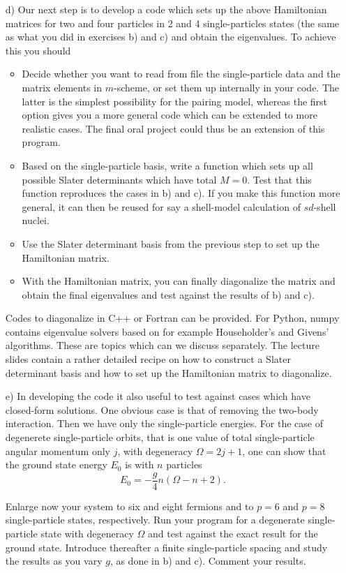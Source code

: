 \documentclass[prc]{revtex4}
\begin{document}
\begin{enumerate}
\item[d)]  Our next step is to develop a code which sets up the above Hamiltonian matrices for two and four particles in 2 and 4 single-particles states (the same as what you did in exercises b) and c) and obtain the eigenvalues.
To achieve this you should
\begin{itemize}
\item Decide whether you want to read from file the single-particle data and the matrix elements in $m$-scheme, or set them up internally in your code.
The latter is the simplest possibility for the pairing model, whereas the first option gives you a more general code which can be extended to more realistic cases. The final oral project could thus be an extension of this program. 
\item Based on the single-particle basis, write a function which sets up all possible Slater determinants which have total $M=0$. 
Test that this function  reproduces the cases in b) and c). If you make this function more general, it can then be reused for say a shell-model
calculation of $sd$-shell nuclei.
\item Use the Slater determinant basis from the previous step to set up the Hamiltonian matrix.
\item With the Hamiltonian matrix, you can finally diagonalize the matrix and obtain the final eigenvalues and test against the results of b) and c).
\end{itemize}
Codes to diagonalize in C++ or Fortran can be provided. For Python, numpy contains eigenvalue solvers based on for example Householder's and Givens' algorithms.   These are topics which can we discuss separately. The lecture slides contain a rather detailed recipe
on how to construct a Slater determinant basis and how to set up the Hamiltonian matrix to diagonalize.

\item[e)]
In developing the code it also useful to test against cases which have closed-form solutions. One obvious case is that of removing the 
two-body interaction. Then we have only the single-particle energies.
For the case of degenerete single-particle orbits, that is one value of total single-particle angular momentum only $j$, with degeneracy $\Omega=2j+1$, one can show that the ground state energy $E_0$ is with $n$ particles 
\[
E_0= -\frac{g}{4}n\left(\Omega-n+2\right).
\]

Enlarge now your system to six and eight fermions and to $p=6$ and $p=8$ single-particle states, respectively. Run your program for a degenerate single-particle state with degeneracy $\Omega$ and test
against the exact result for the ground state. Introduce thereafter a finite single-particle spacing and study the results as you vary $g$,  as done in b) and c). Comment your results. 
\end{enumerate}
\end{document}
